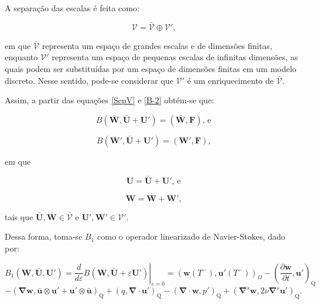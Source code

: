 \documentclass[_ArquivoPrincipal.tex]{subfiles}
\begin{document}
A separação das escalas é feita como:

\begin{equation}
    \mathcal{V}=\bar{\mathcal{V}}\oplus\mathcal{V}'\text{,}
    \label{SepV}
\end{equation}

\noindent em que $\bar{\mathcal{V}}$ representa um espaço de grandes escalas e de dimensões finitas, enquanto $\mathcal{V}'$ representa um espaço de pequenas escalas de infinitas dimensões, as quais podem ser substituídas por um espaço de dimensões finitas em um modelo discreto. Nesse sentido, pode-se considerar que $\mathcal{V}'$ é um enriquecimento de $\bar{\mathcal{V}}$.

Assim, a partir das equações \ref{SepV} e \ref{B-2} obtém-se que:

\begin{equation}
    B(\bar{\mathbf{W}},\bar{\mathbf{U}}+\mathbf{U}')=(\bar{\mathbf{W}},\mathbf{F})\text{, e}
    \label{B-3}
\end{equation}

\begin{equation}
    B(\mathbf{W}',\bar{\mathbf{U}}+\mathbf{U}')=(\mathbf{W}',\mathbf{F})\text{,}
    \label{B-4}
\end{equation}

\noindent em que

\begin{equation}
    \mathbf{U}=\bar{\mathbf{U}}+\mathbf{U}'\text{, e}
    \label{U}
\end{equation}

\begin{equation}
    \mathbf{W}=\bar{\mathbf{W}}+\mathbf{W}'\text{,}
    \label{W}
\end{equation}

\noindent tais que $\bar{\mathbf{U}},\bar{\mathbf{W}}\in\bar{\mathcal{V}}$ e $\mathbf{U}',\mathbf{W}'\in\mathcal{V}'$.

Dessa forma, toma-se $B_1$ como o operador linearizado de Navier-Stokes, dado por:

\[B_1(\mathbf{W},\bar{\mathbf{U}},\mathbf{U}')=\left.\frac{d}{d\varepsilon}B(\mathbf{W},\bar{\mathbf{U}}+\varepsilon\mathbf{U}')\right|_{\varepsilon=0}
=(\mathbf{w}(T^-),\mathbf{u}'(T^-))_\Omega
-\left(\frac{\partial\mathbf{w}}{\partial t},\mathbf{u}'\right)_\mathrm{Q}\]
\begin{equation}
    -(\mathbf{\nabla}\mathbf{w},\bar{\mathbf{u}}\otimes\mathbf{u}'+\mathbf{u}'\otimes\bar{\mathbf{u}})_\mathrm{Q}
    +(q,\mathbf{\nabla}\cdot\mathbf{u}')_\mathrm{Q}
    -(\mathbf{\nabla}\cdot\mathbf{w},p')_\mathrm{Q}
    +(\mathbf{\nabla}^s\mathbf{w},2\nu\mathbf{\nabla}^s\mathbf{u}')_\mathrm{Q}
    \text{.}
    \label{B_1}
\end{equation}
\end{document}
